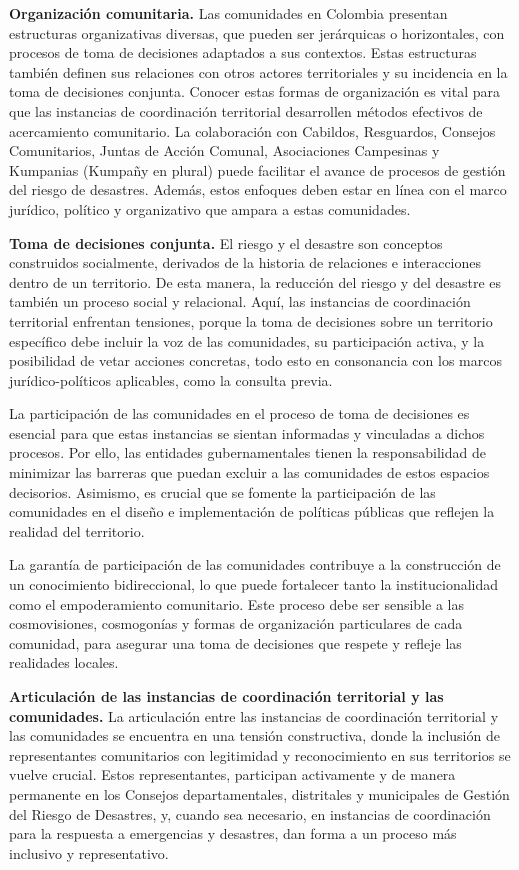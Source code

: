 \documentclass[
  spanish,
  letterpaper,
]{book}
\begin{document}
\textbf{Organización comunitaria.} Las comunidades en Colombia presentan
estructuras organizativas diversas, que pueden ser jerárquicas o
horizontales, con procesos de toma de decisiones adaptados a sus
contextos. Estas estructuras también definen sus relaciones con otros
actores territoriales y su incidencia en la toma de decisiones conjunta.
Conocer estas formas de organización es vital para que las instancias de
coordinación territorial desarrollen métodos efectivos de acercamiento
comunitario. La colaboración con Cabildos, Resguardos, Consejos
Comunitarios, Juntas de Acción Comunal, Asociaciones Campesinas y
Kumpanias (Kumpañy en plural) puede facilitar el avance de procesos de
gestión del riesgo de desastres. Además, estos enfoques deben estar en
línea con el marco jurídico, político y organizativo que ampara a estas
comunidades.

\textbf{Toma de decisiones conjunta.} El riesgo y el desastre son
conceptos construidos socialmente, derivados de la historia de
relaciones e interacciones dentro de un territorio. De esta manera, la
reducción del riesgo y del desastre es también un proceso social y
relacional. Aquí, las instancias de coordinación territorial enfrentan
tensiones, porque la toma de decisiones sobre un territorio específico
debe incluir la voz de las comunidades, su participación activa, y la
posibilidad de vetar acciones concretas, todo esto en consonancia con
los marcos jurídico-políticos aplicables, como la consulta previa.

La participación de las comunidades en el proceso de toma de decisiones
es esencial para que estas instancias se sientan informadas y vinculadas
a dichos procesos. Por ello, las entidades gubernamentales tienen la
responsabilidad de minimizar las barreras que puedan excluir a las
comunidades de estos espacios decisorios. Asimismo, es crucial que se
fomente la participación de las comunidades en el diseño e
implementación de políticas públicas que reflejen la realidad del
territorio.

La garantía de participación de las comunidades contribuye a la
construcción de un conocimiento bidireccional, lo que puede fortalecer
tanto la institucionalidad como el empoderamiento comunitario. Este
proceso debe ser sensible a las cosmovisiones, cosmogonías y formas de
organización particulares de cada comunidad, para asegurar una toma de
decisiones que respete y refleje las realidades locales.

\textbf{Articulación de las instancias de coordinación territorial y las
comunidades.} La articulación entre las instancias de coordinación
territorial y las comunidades se encuentra en una tensión constructiva,
donde la inclusión de representantes comunitarios con legitimidad y
reconocimiento en sus territorios se vuelve crucial. Estos
representantes, participan activamente y de manera permanente en los
Consejos departamentales, distritales y municipales de Gestión del
Riesgo de Desastres, y, cuando sea necesario, en instancias de
coordinación para la respuesta a emergencias y desastres, dan forma a un
proceso más inclusivo y representativo.
\end{document}
